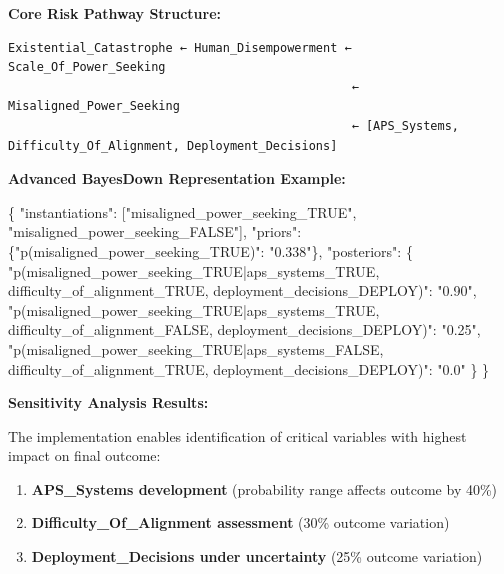 \documentclass[
  11pt,
  letterpaper,
]{book}
\newenvironment{Shaded}{\begin{snugshade}}{\end{snugshade}}
\newcommand{\DataTypeTok}[1]{\textcolor[rgb]{0.68,0.00,0.00}{#1}}
\newcommand{\FunctionTok}[1]{\textcolor[rgb]{0.28,0.35,0.67}{#1}}
\newcommand{\OtherTok}[1]{\textcolor[rgb]{0.00,0.23,0.31}{#1}}
\newcommand{\StringTok}[1]{\textcolor[rgb]{0.13,0.47,0.30}{#1}}
\providecommand{\tightlist}{%
  \setlength{\itemsep}{0pt}\setlength{\parskip}{0pt}}
\begin{document}
\textbf{Core Risk Pathway Structure:}

\begin{verbatim}
Existential_Catastrophe ← Human_Disempowerment ← Scale_Of_Power_Seeking
                                                ← Misaligned_Power_Seeking
                                                ← [APS_Systems, Difficulty_Of_Alignment, Deployment_Decisions]
\end{verbatim}

\textbf{Advanced BayesDown Representation Example:}

\begin{Shaded}
\begin{Highlighting}[]
\FunctionTok{\{}
  \DataTypeTok{"instantiations"}\FunctionTok{:} \OtherTok{[}\StringTok{"misaligned\_power\_seeking\_TRUE"}\OtherTok{,} \StringTok{"misaligned\_power\_seeking\_FALSE"}\OtherTok{]}\FunctionTok{,}
  \DataTypeTok{"priors"}\FunctionTok{:} \FunctionTok{\{}\DataTypeTok{"p(misaligned\_power\_seeking\_TRUE)"}\FunctionTok{:} \StringTok{"0.338"}\FunctionTok{\},}
  \DataTypeTok{"posteriors"}\FunctionTok{:} \FunctionTok{\{}
    \DataTypeTok{"p(misaligned\_power\_seeking\_TRUE|aps\_systems\_TRUE, difficulty\_of\_alignment\_TRUE, deployment\_decisions\_DEPLOY)"}\FunctionTok{:} \StringTok{"0.90"}\FunctionTok{,}
    \DataTypeTok{"p(misaligned\_power\_seeking\_TRUE|aps\_systems\_TRUE, difficulty\_of\_alignment\_FALSE, deployment\_decisions\_DEPLOY)"}\FunctionTok{:} \StringTok{"0.25"}\FunctionTok{,}
    \DataTypeTok{"p(misaligned\_power\_seeking\_TRUE|aps\_systems\_FALSE, difficulty\_of\_alignment\_TRUE, deployment\_decisions\_DEPLOY)"}\FunctionTok{:} \StringTok{"0.0"}
  \FunctionTok{\}}
\FunctionTok{\}}
\end{Highlighting}
\end{Shaded}

\textbf{Sensitivity Analysis Results:}

The implementation enables identification of critical variables with
highest impact on final outcome:

\begin{enumerate}
\def\labelenumi{\arabic{enumi}.}
\tightlist
\item
  \textbf{APS\_Systems development} (probability range affects outcome
  by 40\%)
\item
  \textbf{Difficulty\_Of\_Alignment assessment} (30\% outcome variation)
\item
  \textbf{Deployment\_Decisions under uncertainty} (25\% outcome
  variation)
\end{enumerate}
\end{document}
